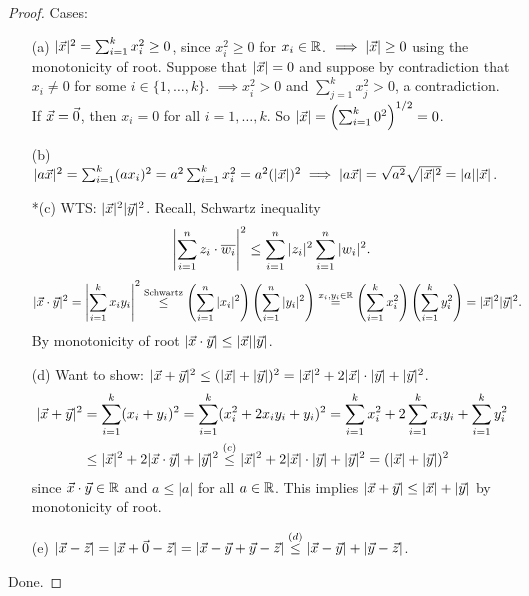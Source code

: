 \documentclass[]{article}
\begin{document}
\begin{proof}
	Cases:
	\begin{enumerate}
		\item[(a)] $|\vec{x}|^2 = \sum_{i=1}^k x_i^2 \geq 0$, since $x_i^2 \geq 0$ for $x_i\in\mathbb{R}$. $\implies |\vec{x}| \geq 0$ using the monotonicity of root. Suppose that $|\vec{x}| = 0$ and suppose by contradiction that $x_i\neq 0$ for some $i\in\{1,\dots,k\}$. $\implies x_i^2 >0$ and $\sum_{j=1}^k x_j^2 > 0$, a contradiction. If $\vec{x} = \vec{0}$, then $x_i = 0$ for all $i = 1,\dots,k$. So $|\vec{x}| = \left( \sum_{i=1}^k 0^2 \right)^{1/2} = 0$.
		\item[(b)] $|a\vec{x}|^2 = \sum_{i=1}^k (a x_i)^2 = a^2 \sum_{i=1}^k x_i^2 = a^2(|\vec{x}|)^2 \implies |a\vec{x}| = \sqrt{a^2}\sqrt{|\vec{x}|^2} = |a||\vec{x}|$.
		\item[*(c)] WTS: $|\vec{x}|^2|\vec{y}|^2$. Recall, Schwartz inequality $$\left| \sum_{i=1}^n z_i \cdot \overline{w_i} \right|^2 \leq \sum_{i=1}^n |z_i|^2 \sum_{i=1}^n |w_i|^2.$$
			\begin{align*}
				|\vec{x}\cdot \vec{y}|^2 &= \left| \sum_{i=1}^k x_iy_i \right|^2
				\overset{\text{Schwartz}}{\leq} \left(\sum_{i=1}^n |x_i|^2 \right) \left( \sum_{i=1}^n |y_i|^2 \right) \overset{x_i,y_i\in\mathbb{R}}{=} \left(\sum_{i=1}^k x_i^2 \right) \left( \sum_{i=1}^k y_i^2 \right) = |\vec{x}|^2 |\vec{y}|^2.
			\end{align*}
			By monotonicity of root $|\vec{x}\cdot \vec{y}| \leq |\vec{x}||\vec{y}|$.
		\item[(d)] Want to show: $|\vec{x} + \vec{y}|^2 \leq (|\vec{x}| + |\vec{y}|)^2 = |\vec{x}|^2 + 2|\vec{x}|\cdot|\vec{y}| + |\vec{y}|^2$.
			\begin{align*}
				|\vec{x} + \vec{y}|^2 &= \sum_{i=1}^k (x_i+y_i)^2 = \sum_{i=1}^k (x_i^2 + 2x_i y_i + y_i)^2
				= \sum_{i=1}^k x_i^2 + 2 \sum_{i=1}^k x_i y_i + \sum_{i=1}^k y_i^2 \\
				&\leq |\vec{x}|^2 + 2|\vec{x} \cdot \vec{y}| + |\vec{y}|^2 \overset{(c)}{\leq} |\vec{x}|^2 + 2|\vec{x}|\cdot |\vec{y}| + |\vec{y}|^2 = (|\vec{x}| + |\vec{y}|)^2
			\end{align*}
			since $\vec{x}\cdot\vec{y}\in\mathbb{R}$ and $a\leq |a|$ for all $a\in\mathbb{R}$. This implies $|\vec{x} + \vec{y}| \leq |\vec{x}| + |\vec{y}|$ by monotonicity of root.
		\item[(e)] $|\vec{x} - \vec{z}| = |\vec{x} + \vec{0} - \vec{z}| = |\vec{x} - \vec{y} + \vec{y} - \vec{z}| \overset{(d)}{\leq} |\vec{x}-\vec{y}| + |\vec{y}-\vec{z}|$.
	\end{enumerate}
	Done.
\end{proof}
\end{document}
